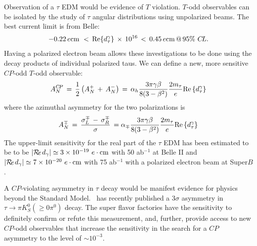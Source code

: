Observation of a $\tau$ EDM would be evidence of $T$ violation.  $T$-odd observables can be isolated by the study of $\tau$ angular
distributions using unpolarized beams. The best current limit is from Belle:
\vskip -12pt
\[ - 0.22\,e{\rm{cm}}\,\, < \,{\mathop{\rm Re}\nolimits} \{ d_\tau ^\gamma \} \, \times \,{10^{16}}\, < \,0.45\,e{\rm{cm}}\,@\,95\% \,\,C\!L.\]
\vskip -8pt
Having a polarized electron
beam allows these investigations to be done using the decay products
of individual polarized taus. We can define a new, more sensitive $C\!P$-odd $T$-odd observable:
\vskip -12pt
\[A_N^{C\!P}\, = \,\frac{1}{2}\left( {A_N^ + \, + \,A_N^ - } \right)\, = \,{\alpha _h}\frac{{3\pi \gamma \beta }}{{8(3 - {\beta ^2})}}\frac{{2{m_\tau }}}{e}{\mathop{\rm Re}\nolimits} \left\{ {d_\tau ^\gamma } \right\}\]
where the azimuthal asymmetry for the two polarizations is 
\[A_N^ \mp \, = \,\frac{{\sigma _L^ \mp \, - \,\sigma _R^ \mp }}{\sigma }\, = {\alpha _ \mp }\frac{{3\pi \gamma \beta }}{{8(3 - {\beta ^2})}}\frac{{2{m_\tau }}}{e}{\mathop{\rm Re}\nolimits} \left\{ {d_\tau ^\gamma } \right\}\]
\vskip -12pt
The upper-limit sensitivity for the real part of the
$\tau$ EDM has been estimated to be to be $|\Re{d_\gamma}|\simeq 3\times 10^{-19} \ e \cdot {\rm cm}$
with 50 ab$^{-1 }$ at Belle II and $|\Re{d_\gamma}|\simeq 7\times 10^{-20} \ e \cdot {\rm cm}$
with 75 ab$^{-1 }$ with a polarized electron beam at Super$B$\cite{ref:b2}.

A $C\!P$-violating asymmetry in $\tau$ decay would be manifest evidence
for physics beyond the Standard Model. \babar\ has recently published
a 3$\sigma$ asymmetry in $\tau\to\pi K_S^0(\ge 0\pi^0)$
decay\cite{BABAR:2011aa}. The super flavor factories have the sensitivity to
definitely confirm or refute this measurement, and, further, provide
access to new $C\!P$-odd observables that increase the sensitivity in the
search for a $C\!P$ asymmetry to the level of $\sim 10^{-3}$.
